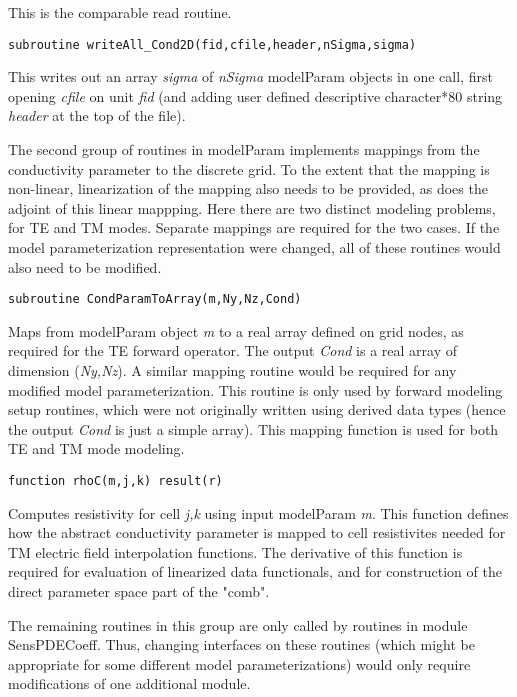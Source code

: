 \documentclass[12pt]{article}
\begin{document}
This is the comparable read routine.

\begin{verbatim}
subroutine writeAll_Cond2D(fid,cfile,header,nSigma,sigma)
\end{verbatim}

This writes out an array {\it sigma} of {\it nSigma} modelParam objects
in one call, first opening {\it cfile} on unit {\it fid} (and
adding user defined descriptive character*80 string {\it header}
at the top of the file).

The second group of routines in modelParam implements
mappings from the conductivity parameter to the discrete
grid.  To the extent that the mapping is non-linear, linearization
of the mapping also needs to be provided, as does the adjoint
of this linear mappping.  Here there are two distinct modeling
problems, for TE and TM modes.  Separate mappings are required
for the two cases.  If the model parameterization representation
were changed, all of these routines would also need to be modified.

\begin{verbatim}
subroutine CondParamToArray(m,Ny,Nz,Cond)
\end{verbatim}

Maps from modelParam object {\it m} to a real array defined on grid
nodes, as required for the TE forward operator. The output
{\it Cond} is a real array of dimension ({\it Ny,Nz}).
A similar mapping routine
would be required for any modified model parameterization.
This routine is only used by forward modeling setup routines,
which were not originally written using derived data types
(hence the output {\it Cond} is just a simple array).
This mapping function is used for both TE and TM mode modeling.

\begin{verbatim}
function rhoC(m,j,k) result(r)
\end{verbatim}

Computes resistivity for cell {\it j,k} using input modelParam {\it m}.  
This function defines how the abstract conductivity parameter is 
mapped to cell resistivites needed for TM electric field interpolation 
functions.  The derivative of this function is required for evaluation 
of linearized data functionals, and for construction of the direct
parameter space part of the "comb".

The remaining routines in this group are only called by
routines in module SensPDECoeff.  Thus, changing interfaces 
on these routines (which might be appropriate for some different
model parameterizations) would only require modifications of
one additional module.
\end{document}
